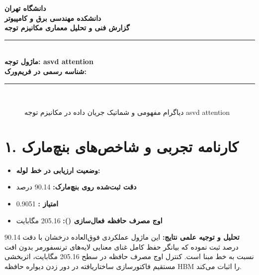 \documentclass[12pt,a4paper]{article}
\begin{document}
\begin{center}
{\Large\bfseries دانشگاه تهران}\\[0.2cm]
{\large\bfseries دانشکده مهندسی برق و کامپیوتر}\\[0.2cm]
{\large\bfseries گزارش فنی و تحلیل معماری مکانیزم توجه}\\[0.5cm]
\rule{\linewidth}{1pt}\\[0.3cm]
{\LARGE\bfseries ماژول توجه: asvd attention}\\[0.2cm]
{\large \textbf{شناسه رسمی در فریم‌ورک:} }\\[0.2cm]
\rule{\linewidth}{1pt}\\[0.5cm]
\end{center}

\begin{figure}[H]
\centering
{}
\caption{دیاگرام مفهومی و شماتیک جریان داده در مکانیزم توجه asvd attention}
\end{figure}

\section*{۱. کارنامه تجربی و شاخص‌های بنچ‌مارک}
\begin{itemize}
\item \textbf{وضعیت ارزیابی در خط لوله:} 
\item \textbf{دقت ثبت‌شده روی بنچ‌مارک:} 90.14 درصد
\item \textbf{امتیاز :} 0.9051
\item \textbf{اوج مصرف حافظه فعال‌سازی ():} 205.16 مگابایت
\end{itemize}
\textbf{تحلیل و توجیه علمی نتایج:} این ماژول عملکردی فوق‌العاده درخشان با دقت 90.14 درصد ثبت نموده که بیانگر حفظ کامل غنای معنایی لایه‌های ترنسفورمر بدون افت نسبت به خط مبنا است. کنترل اوج مصرف حافظه در سطح 205.16 مگابایت، اثربخشی مستقیم فاکتورسازی ساختاریافته در دور زدن دیواره حافظه HBM را اثبات می‌کند.
\end{document}
